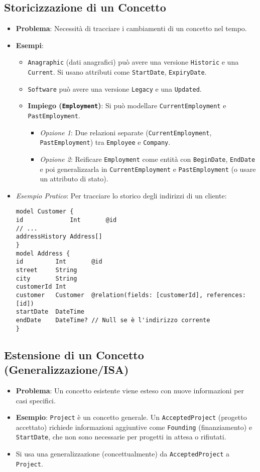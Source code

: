 \subsection{Storicizzazione di un Concetto}
\begin{itemize}
	\item \textbf{Problema}: Necessità di tracciare i cambiamenti di un concetto nel tempo.
	\item \textbf{Esempi}:
	\begin{itemize}
		\item \texttt{Anagraphic} (dati anagrafici) può avere una versione \texttt{Historic} e una \texttt{Current}. Si usano attributi come \texttt{StartDate}, \texttt{ExpiryDate}.
		\item \texttt{Software} può avere una versione \texttt{Legacy} e una \texttt{Updated}.
		\item \textbf{Impiego (\texttt{Employment})}: Si può modellare \texttt{CurrentEmployment} e \texttt{PastEmployment}.
		\begin{itemize}
			\item \textit{Opzione 1}: Due relazioni separate (\texttt{CurrentEmployment}, \texttt{PastEmployment}) tra \texttt{Employee} e \texttt{Company}.
			\item \textit{Opzione 2}: Reificare \texttt{Employment} come entità con \texttt{BeginDate}, \texttt{EndDate} e poi generalizzarla in \texttt{CurrentEmployment} e \texttt{PastEmployment} (o usare un attributo di stato).
		\end{itemize}
	\end{itemize}
	\item \textit{Esempio Pratico}: Per tracciare lo storico degli indirizzi di un cliente:
	\begin{verbatim}
model Customer {
id             Int       @id
// ...
addressHistory Address[]
}
model Address {
id         Int       @id
street     String
city       String
customerId Int
customer   Customer  @relation(fields: [customerId], references: [id])
startDate  DateTime
endDate    DateTime? // Null se è l'indirizzo corrente
}
	\end{verbatim}
\end{itemize}

\subsection{Estensione di un Concetto (Generalizzazione/ISA)}
\begin{itemize}
	\item \textbf{Problema}: Un concetto esistente viene esteso con nuove informazioni per casi specifici.
	\item \textbf{Esempio}: \texttt{Project} è un concetto generale. Un \texttt{AcceptedProject} (progetto accettato) richiede informazioni aggiuntive come \texttt{Founding} (finanziamento) e \texttt{StartDate}, che non sono necessarie per progetti in attesa o rifiutati.
	\item Si usa una generalizzazione (concettualmente) da \texttt{AcceptedProject} a \texttt{Project}.
\end{itemize}

